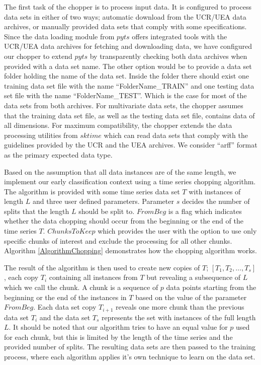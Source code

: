 The first task of the chopper is to process input data.
It is configured to process data sets in either of two ways; automatic download from the UCR/UEA data archives,
or manually provided data sets that comply with some specifications.
Since the data loading module from $pyts$ \cite{JMLR:v21:19-763} offers integrated tools with the UCR/UEA data archives for fetching and downloading data,
we have configured our chopper to extend $pyts$ by transparently checking both data archives when provided with a data set name.
The other option would be to provide a data set folder holding the name of the data set.
Inside the folder there should exist one training data set file with the name \enquote{FolderName\_TRAIN} and one testing data set file with the name \enquote{FolderName\_TEST}.
Which is the case for most of the data sets from both archives.
For multivariate data sets, the chopper assumes that the training data set file, as well as the testing data set file, contains data of all dimensions.
For maximum compatibility, the chopper extends the data processing utilities from $sktime$ \cite{loning2019sktime}
which can read data sets that comply with the guidelines provided by the UCR and the UEA archives.
We consider \enquote{arff} format as the primary expected data type.

Based on the assumption that all data instances are of the same length, we implement our early classification context using a time series chopping algorithm.
The algorithm is provided with some time series data set $T$ with instances of length $L$ and three user defined parameters.
Parameter $s$ decides the number of splits that the length $L$ should be split to.
$FromBeg$ is a flag which indicates whether the data chopping should occur from the beginning or the end of the time series $T$.
$ChunksToKeep$ which provides the user with the option to use only specific chunks of interest and exclude the processing for all other chunks.
Algorithm \ref{AlgorithmChopping} demonstrates how the chopping algorithm works.

The result of the algorithm is then used to create new copies of $T$; $[T_{1}, T_{2}, \ldots, T_{s}]$, each copy $T_{i}$ containing all instances from $T$ but revealing a subsequence of $L$
which we call the chunk. A chunk is a sequence of $p$ data points starting from the beginning or the end of the instances in $T$ based on the value of the parameter $FromBeg$.
Each data set copy $T_{i+1}$ reveals one more chunk than the previous data set $T_{i}$ and the data set $T_{s}$ represents the set with instances of the full length $L$.
It should be noted that our algorithm tries to have an equal value for $p$ used for each chunk, but this is limited by the length of the time series and the provided number of splits.
The resulting data sets are then passed to the training process, where each algorithm applies it's own technique to learn on the data set.

